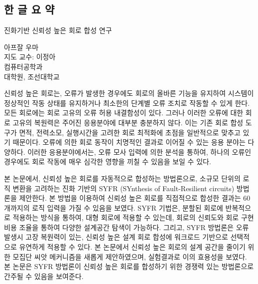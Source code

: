 \begin{center}
\section*{한 글 요 약}
\end{center}

\bigskip
\bigskip
\centerline{\large{진화기반 신뢰성 높은 회로 합성 연구}}
\bigskip

\begin{flushright}
아프잘 우마\\
지도 교수: 이정아\\
컴퓨터공학과\\
대학원, 조선대학교\\
\end{flushright}

신뢰성 높은 회로는, 오류가 발생한 경우에도 회로의 올바른 기능을 유지하여 시스템이 정상적인 작동 상태를 유지하거나 최소한의 단계별 오류 조치로 작동할 수 있게 한다. 모든 회로에는 회로 고유의 오류 허용 내결함성이 있다. 그러나 이러한 오류에 대한 회로 고유의 복원력은 주어진 응용분야에 대부분 충분하지 않다. 이는 기존 회로 합성 도구가 면적, 전력소모, 실행시간을 고려한 회로 최적화에 초점을 일반적으로 맞추고 있기 때문이다. 오류에 의한 회로 동작이 치명적인 결과로 이어질 수 있는 응용 분야는 다양하다. 이러한 응용분야에서는, 오류 모사 입력에 의한 분석을 통하여, 하나의 오류인 경우에도 회로 작동에 매우 심각한 영향을 끼칠 수 있음을 보일 수 있다.

본 논문에서, 신뢰성 높은 회로를 자동적으로 합성하는 방법론으로, 소규모 단위의 로직 변환을 고려하는 진화 기반의 SYFR (SYnthesis of Fault-Resilient circuits) 방법론을 제안한다. 본 방법을 이용하여 신뢰성 높은 회로를 직접적으로 합성한 결과는 60개까지의 로직 입력을 가질 수 있음을 보였다. SYFR 기법은, 분할된 회로에 반복적으로 적용하는 방식을 통하여, 대형 회로에 적용할 수 있는데, 회로의 신뢰도와 회로 구현 비용 조율을 통하여 다양한 설계공간 탐색이 가능하다. 그리고, SYFR 방법론은 오류 발생시 고장 복원력이 있는, 신뢰성 높은 설계 회로 합성에 워크로드 기반으로 선택적으로 유연하게 적용할 수 있다.  본 논문에서 신뢰성 높은 회로의 설계 공간을 줄이기 위한 모집단 씨앗 메커니즘을 새롭게 제안하였으며, 실험결과로 이의 효용성을 보였다.  본 논문은 SYFR 방법론이 신뢰성 높은 회로를 합성하기 위한 경쟁력 있는 방법론으로 간주될 수 있음을 보여준다.


